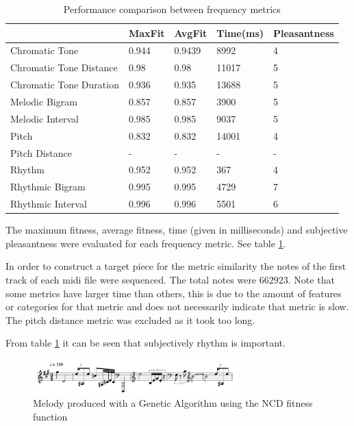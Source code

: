 \begin{table}[htbp]
  \centering
  \caption{Performance comparison between frequency metrics}
    \begin{tabular}{l|llll}
    \toprule
          & MaxFit & AvgFit & Time(ms) & Pleasantness \\
    \midrule
    Chromatic Tone & 0.944 & 0.9439 & 8992  & 4 \\
    Chromatic Tone Distance & 0.98  & 0.98  & 11017 & 5 \\
    Chromatic Tone Duration & 0.936 & 0.935 & 13688 & 5 \\
    Melodic Bigram & 0.857 & 0.857 & 3900  & 5 \\
    Melodic Interval & 0.985 & 0.985 & 9037  & 5 \\
    Pitch & 0.832 & 0.832 & 14001 & 4 \\
    Pitch Distance & -     & -     & -     & - \\
    Rhythm & 0.952 & 0.952 & 367   & 4 \\
    Rhythmic Bigram & 0.995 & 0.995 & 4729  & 7 \\
    Rhythmic Interval & 0.996 & 0.996 & 5501  & 6 \\
    \bottomrule
    \end{tabular}%
  \label{tab:metriccomp}%
\end{table}%

The maximum fitness, average fitness, time (given in milliseconds) and subjective pleasantness were evaluated for each frequency metric. See table \ref{tab:metriccomp}. 

In order to construct a target piece for the metric similarity the notes of the first track of each midi file were sequenced. The total notes were $662923$. Note that some metrics have larger time than others, this is due to the amount of features or categories for that metric and does not necessarily indicate that metric is slow. The pitch distance metric was excluded as it took too long.

From table \ref{tab:metriccomp} it can be seen that subjectively rhythm is important.




\begin{figure}
\centerline{\includegraphics[width=300px]{../images/genetic_ncd.pdf}}
\caption{Melody produced with a Genetic Algorithm using the \ac{NCD} fitness function}
\label{ims:genetic_mel_ncd}
\end{figure}

